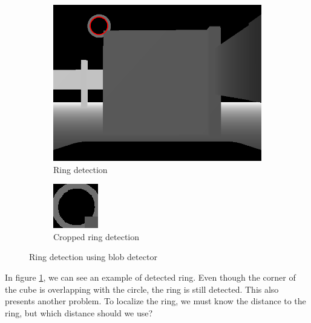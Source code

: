 \documentclass[12pt,a4paper]{article}
\begin{document}
	\begin{figure}[h]
		\begin{subfigure}{.5\textwidth}
			\centering
			\includegraphics[width=.8\linewidth]{images/ring_detection}
			\caption{Ring detection}
			\label{fig:detected_ring}
		\end{subfigure}
		\begin{subfigure}{.5\textwidth}
			\centering
			\includegraphics[width=.8\linewidth]{images/ring_detection_cropped}
			\caption{Cropped ring detection}
			\label{fig:detected_ring_cropped}
		\end{subfigure}
		\caption{Ring detection using blob detector}
		\label{fig:ring_detection}
	\end{figure}

	In figure \ref{fig:detected_ring}, we can see an example of detected ring. Even though the corner of the cube is overlapping with the circle, the ring is still detected. This also presents another problem. To localize the ring, we must know the distance to the ring, but which distance should we use? \\
	
\end{document}
